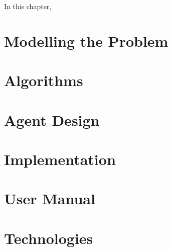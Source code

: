 In this chapter, 

\section{Modelling the Problem}

\section{Algorithms}

\section{Agent Design}

\section{Implementation}

\section{User Manual}

\section{Technologies}
